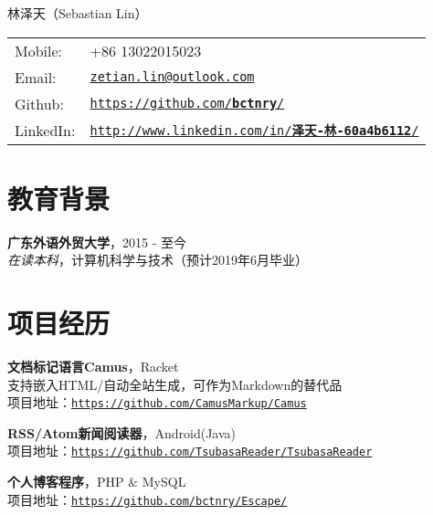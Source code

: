 \documentclass[a4paper]{article}
\def\name{林泽天（Sebastian Lin）}
\renewenvironment{itemize}{
  \begin{list}{}{
    \setlength{\leftmargin}{1.5em}
  }
}{
  \end{list}
}
\begin{document}
{\huge \name}


\vspace{0.15in}

\begin{minipage}{0.45\linewidth}
  \begin{tabular}{ll}
    Mobile: & +86 13022015023 \\
    Email: & \href{mailto:zetian.lin@outlook.com}{\tt zetian.lin@outlook.com} \\
    Github: & \href{https://github.com/bctnry/}{\tt https://github.com/\textbf{bctnry}/} \\
    LinkedIn: & \href{http://www.linkedin.com/in/泽天-林-60a4b6112/}{\tt http://www.linkedin.com/in/\textbf{泽天-林-60a4b6112}/} \\
  \end{tabular}
\end{minipage}



\section*{教育背景}

\begin{itemize}
  \item{\textbf{广东外语外贸大学}，2015 - 至今\\\textit{在读本科}，计算机科学与技术（预计2019年6月毕业）}
\end{itemize}



\section*{项目经历}

\begin{itemize}
\item{
    \textbf{文档标记语言Camus}，Racket\\
    支持嵌入HTML/自动全站生成，可作为Markdown的替代品\\
    项目地址：\href{https://github.com/CamusMarkup/Camus}{\tt https://github.com/CamusMarkup/Camus}
  }
\item{
    \textbf{RSS/Atom新闻阅读器}，Android(Java)\\
    项目地址：\href{https://github.com/TsubasaReader/TsubasaReader}{\tt https://github.com/TsubasaReader/TsubasaReader}
  }
\item{
    \textbf{个人博客程序}，PHP \& MySQL\\
    项目地址：\href{https://github.com/bctnry/Escape/}{\tt https://github.com/bctnry/Escape/}
  }
\end{itemize}
  
\end{document}
